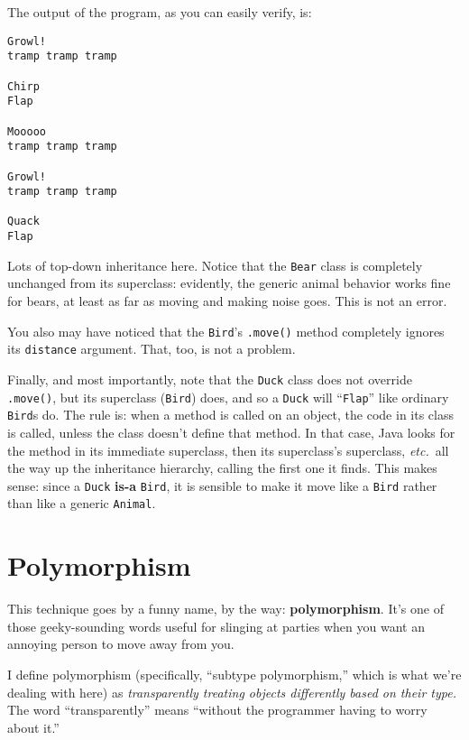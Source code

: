 \begin{samepage}
The output of the program, as you can easily verify, is:

\begin{Verbatim}[fontsize=\footnotesize,samepage=true,frame=single]
Growl!
tramp tramp tramp 

Chirp
Flap

Mooooo
tramp tramp tramp 

Growl!
tramp tramp tramp 

Quack
Flap
\end{Verbatim}
\end{samepage}

Lots of top-down inheritance here. Notice that the \texttt{Bear} class is
completely unchanged from its superclass: evidently, the generic animal
behavior works fine for bears, at least as far as moving and making noise
goes. This is not an error.

You also may have noticed that the \texttt{Bird}'s \texttt{.move()} method
completely ignores its \texttt{distance} argument. That, too, is not a
problem.

Finally, and most importantly, note that the \texttt{Duck} class does not
override \texttt{.move()}, but its superclass (\texttt{Bird}) does, and so a
\texttt{Duck} will ``\texttt{Flap}'' like ordinary \texttt{Bird}s
do. The rule is: when a method is called on an object, the code in its class
is called, unless the class doesn't define that method. In that case, Java
looks for the method in its immediate superclass, then its superclass's
superclass, \textit{etc.}~all the way up the inheritance hierarchy, calling
the first one it finds. This makes sense: since a \texttt{Duck} \textbf{is-a}
\texttt{Bird}, it is sensible to make it move like a \texttt{Bird} rather than
like a generic \texttt{Animal}.

\section{Polymorphism}

This technique goes by a funny name, by the way: \textbf{polymorphism}. It's
one of those geeky-sounding words useful for slinging at parties when you want
an annoying person to move away from you.

I define polymorphism (specifically, ``subtype polymorphism,'' which is what
we're dealing with here) as \textit{transparently treating objects differently
based on their type.} The word ``transparently'' means ``without the
programmer having to worry about it.''

